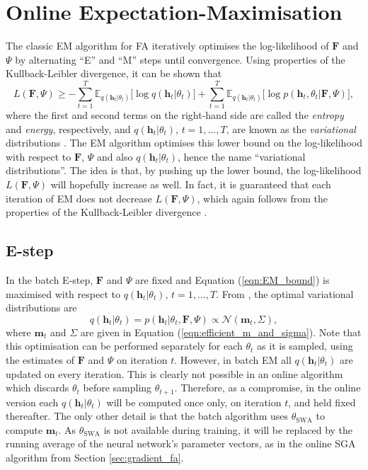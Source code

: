 \documentclass[msc,deptreport.inf]{infthesis} %
\newcommand{\matr}[1]{\mathbf{#1}}
\newcommand{\E}{\mathbb E}
\begin{document}
\section{Online Expectation-Maximisation}\label{sec:online_em}

The classic EM algorithm for FA iteratively optimises the log-likelihood of $\matr{F}$ and $\Psi$ by alternating ``E'' and ``M'' steps until convergence. Using properties of the Kullback-Leibler divergence, it can be shown that 
\begin{equation}\label{eqn:EM_bound}
	L(\matr{F}, \Psi) \geq 
	- \sum_{t=1}^T \E_{q(\matr{h}_t | \theta_t)} \big[\log q(\matr{h}_t | \theta_t)\big]
	+ \sum_{t=1}^T \E_{q(\matr{h}_t | \theta_t)} \big[\log p(\matr{h}_t, \theta_t | \matr{F}, \Psi)\big],
\end{equation}
where the first and second terms on the right-hand side are called the \emph{entropy} and \emph{energy}, respectively, and $q(\matr{h}_t | \theta_t)$, $t=1,\dots,T$, are known as the \emph{variational} distributions \cite{barber2007}. The EM algorithm optimises this lower bound on the log-likelihood with respect to $\matr{F}$, $\Psi$ and also $q(\matr{h}_t | \theta_t)$, hence the name ``variational distributions''. The idea is that, by pushing up the lower bound, the log-likelihood $L(\matr{F}, \Psi)$ will hopefully increase as well. In fact, it is guaranteed that each iteration of EM does not decrease $L(\matr{F}, \Psi)$, which again follows from the properties of the Kullback-Leibler divergence \cite{barber2007}.

\subsection{E-step}

In the batch E-step, $\matr{F}$ and $\Psi$ are fixed and Equation (\ref{eqn:EM_bound}) is maximised with respect to $q(\matr{h}_t | \theta_t)$, $t=1,\dots,T$. From \cite{barber2007}, the optimal variational distributions are 
\begin{equation}
	q(\matr{h}_t | \theta_t) = p(\matr{h}_t | \theta_t, \matr{F}, \Psi)  \propto \mathcal{N}(\matr{m}_t, \Sigma), 
\end{equation}
where $\matr{m}_t$ and $\Sigma$ are given in Equation (\ref{eqn:efficient_m_and_sigma}). Note that this optimisation can be performed separately for each $\theta_t$ as it is sampled, using the estimates of $\matr{F}$ and $\Psi$ on iteration $t$. However, in batch EM all $q(\matr{h}_t | \theta_t)$ are updated on every iteration. This is clearly not possible in an online algorithm which discards $\theta_t$ before sampling $\theta_{t + 1}$. Therefore, as a compromise, in the online version each $q(\matr{h}_t | \theta_t)$ will be computed once only, on iteration $t$, and held fixed thereafter. The only other detail is that the batch algorithm uses $\theta_{\text{SWA}}$ to compute $\matr{m}_t$. As $\theta_{\text{SWA}}$ is not available during training, it will be replaced by the running average of the neural network's parameter vectors, as in the online SGA algorithm from Section \ref{sec:gradient_fa}.
\end{document}
